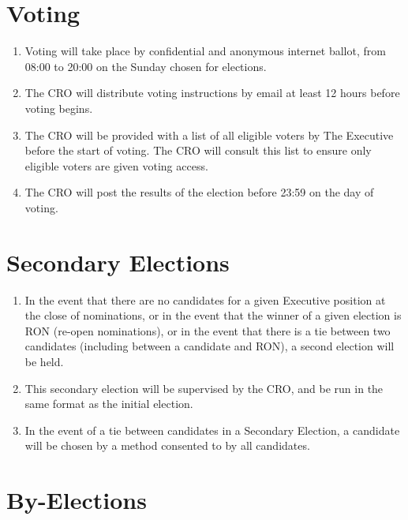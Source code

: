 \documentclass[11pt, a4paper]{article}
\begin{document}
\section{Voting}
\label{sec:voting}

\begin{enumerate}
	\item Voting will take place by confidential and anonymous internet ballot, from 08:00 to 20:00 on the Sunday chosen for elections.
    \item The CRO will distribute voting instructions by email at least 12 hours before voting begins.
    \item The CRO will be provided with a list of all eligible voters by The Executive before the start of voting. The CRO will consult this list to ensure only eligible voters are given voting access.
    \item The CRO will post the results of the election before 23:59 on the day of voting.
\end{enumerate}





\section{Secondary Elections}
\label{sec:secondary_elections}

\begin{enumerate}
	\item In the event that there are no candidates for a given Executive position at the close of nominations, or in the event that the winner of a given election is RON (re-open nominations), or in the event that there is a tie between two candidates (including between a candidate and RON),  a second election will be held.
    \item This secondary election will be supervised by the CRO, and be run in the same format as the initial election.
    \item In the event of a tie between candidates in a Secondary Election, a candidate will be chosen by a method consented to by all candidates.
\end{enumerate}





\section{By-Elections}
\label{sec:by_elections}
\end{document}
